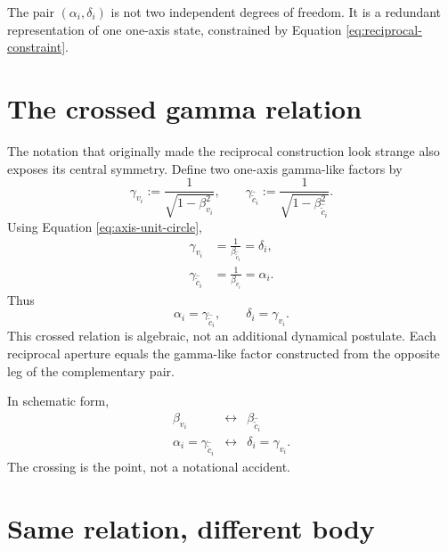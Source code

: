 \documentclass[11pt]{article}
\newcommand{\ccomp}[1]{\widehat{\widetilde{c}}_{#1}}
\begin{document}
The pair $(\alpha_i,\delta_i)$ is not two independent degrees of freedom. It
is a redundant representation of one one-axis state, constrained by
Equation \eqref{eq:reciprocal-constraint}.

\section{The crossed gamma relation}

The notation that originally made the reciprocal construction look strange
also exposes its central symmetry. Define two one-axis gamma-like factors by
\begin{equation}
\gamma_{v_i}
:=
\frac{1}{\sqrt{1-\beta_{v_i}^2}},
\qquad
\gamma_{\ccomp{i}}
:=
\frac{1}{\sqrt{1-\beta_{\ccomp{i}}^2}}.
\label{eq:two-gammas}
\end{equation}
Using Equation \eqref{eq:axis-unit-circle},
\begin{align}
\gamma_{v_i}
&=
\frac{1}{\beta_{\ccomp{i}}}
=\delta_i,
\label{eq:gammav-delta}\\
\gamma_{\ccomp{i}}
&=
\frac{1}{\beta_{v_i}}
=\alpha_i.
\label{eq:gammac-alpha}
\end{align}
Thus
\begin{equation}
\boxed{
\alpha_i=\gamma_{\ccomp{i}},
\qquad
\delta_i=\gamma_{v_i}.
}
\label{eq:crossed-gamma}
\end{equation}
This crossed relation is algebraic, not an additional dynamical postulate.
Each reciprocal aperture equals the gamma-like factor constructed from the
opposite leg of the complementary pair.

In schematic form,
\begin{equation}
\begin{array}{ccc}
\beta_{v_i} & \longleftrightarrow & \beta_{\ccomp{i}} \\
\alpha_i=\gamma_{\ccomp{i}}
& \longleftrightarrow &
\delta_i=\gamma_{v_i}.
\end{array}
\label{eq:cross-diagram}
\end{equation}
The crossing is the point, not a notational accident.

\section{Same relation, different body}
\end{document}
